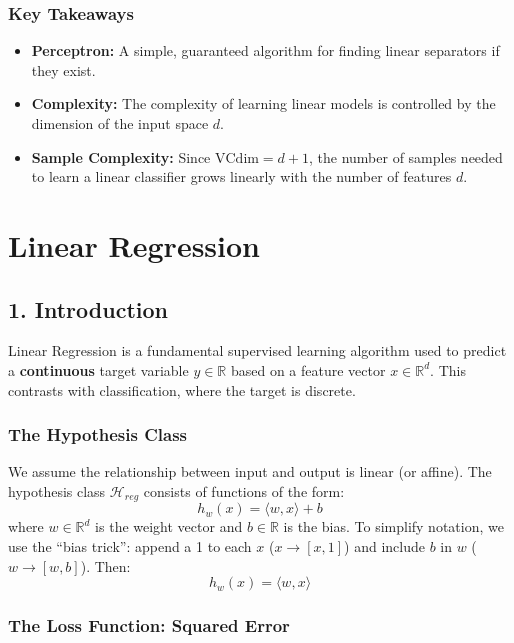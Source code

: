\documentclass[
  italian,
  11pt,
]{article}
\providecommand{\tightlist}{%
  \setlength{\itemsep}{0pt}\setlength{\parskip}{0pt}}
\begin{document}
\subsubsection{Key Takeaways}\label{key-takeaways-5}

\begin{itemize}
\tightlist
\item
  \textbf{Perceptron:} A simple, guaranteed algorithm for finding linear
  separators if they exist.
\item
  \textbf{Complexity:} The complexity of learning linear models is
  controlled by the dimension of the input space \(d\).
\item
  \textbf{Sample Complexity:} Since \(\text{VCdim} = d+1\), the number
  of samples needed to learn a linear classifier grows linearly with the
  number of features \(d\).
\end{itemize}

\newpage

\section{Linear Regression}\label{linear-regression}

\subsection{1. Introduction}\label{introduction}

Linear Regression is a fundamental supervised learning algorithm used to
predict a \textbf{continuous} target variable \(y \in \mathbb{R}\) based
on a feature vector \(x \in \mathbb{R}^d\). This contrasts with
classification, where the target is discrete.

\subsubsection{The Hypothesis Class}\label{the-hypothesis-class}

We assume the relationship between input and output is linear (or
affine). The hypothesis class \(\mathcal{H}_{reg}\) consists of
functions of the form: \[ h_w(x) = \langle w, x \rangle + b \] where
\(w \in \mathbb{R}^d\) is the weight vector and \(b \in \mathbb{R}\) is
the bias. To simplify notation, we use the ``bias trick'': append a 1 to
each \(x\) (\(x \to [x, 1]\)) and include \(b\) in \(w\)
(\(w \to [w, b]\)). Then: \[ h_w(x) = \langle w, x \rangle \]

\subsubsection{The Loss Function: Squared
Error}\label{the-loss-function-squared-error}
\end{document}
